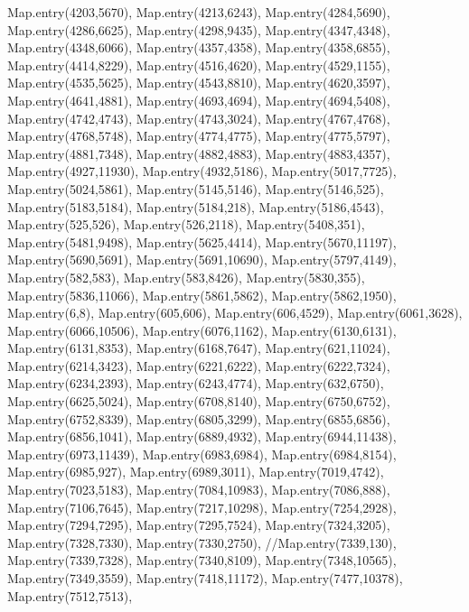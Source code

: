     Map.entry(4203,5670),
    Map.entry(4213,6243),
    Map.entry(4284,5690),
    Map.entry(4286,6625),
    Map.entry(4298,9435),
    Map.entry(4347,4348),
    Map.entry(4348,6066),
    Map.entry(4357,4358),
    Map.entry(4358,6855),
    Map.entry(4414,8229),
    Map.entry(4516,4620),
    Map.entry(4529,1155),
    Map.entry(4535,5625),
    Map.entry(4543,8810),
    Map.entry(4620,3597),
    Map.entry(4641,4881),
    Map.entry(4693,4694),
    Map.entry(4694,5408),
    Map.entry(4742,4743),
    Map.entry(4743,3024),
    Map.entry(4767,4768),
    Map.entry(4768,5748),
    Map.entry(4774,4775),
    Map.entry(4775,5797),
    Map.entry(4881,7348),
    Map.entry(4882,4883),
    Map.entry(4883,4357),
    Map.entry(4927,11930),
    Map.entry(4932,5186),
    Map.entry(5017,7725),
    Map.entry(5024,5861),
    Map.entry(5145,5146),
    Map.entry(5146,525),
    Map.entry(5183,5184),
    Map.entry(5184,218),
    Map.entry(5186,4543),
    Map.entry(525,526),
    Map.entry(526,2118),
    Map.entry(5408,351),
    Map.entry(5481,9498),
    Map.entry(5625,4414),
    Map.entry(5670,11197),
    Map.entry(5690,5691),
    Map.entry(5691,10690),
    Map.entry(5797,4149),
    Map.entry(582,583),
    Map.entry(583,8426),
    Map.entry(5830,355),
    Map.entry(5836,11066),
    Map.entry(5861,5862),
    Map.entry(5862,1950),
    Map.entry(6,8),
    Map.entry(605,606),
    Map.entry(606,4529),
    Map.entry(6061,3628),
    Map.entry(6066,10506),
    Map.entry(6076,1162),
    Map.entry(6130,6131),
    Map.entry(6131,8353),
    Map.entry(6168,7647),
    Map.entry(621,11024),
    Map.entry(6214,3423),
    Map.entry(6221,6222),
    Map.entry(6222,7324),
    Map.entry(6234,2393),
    Map.entry(6243,4774),
    Map.entry(632,6750),
    Map.entry(6625,5024),
    Map.entry(6708,8140),
    Map.entry(6750,6752),
    Map.entry(6752,8339),
    Map.entry(6805,3299),
    Map.entry(6855,6856),
    Map.entry(6856,1041),
    Map.entry(6889,4932),
    Map.entry(6944,11438),
    Map.entry(6973,11439),
    Map.entry(6983,6984),
    Map.entry(6984,8154),
    Map.entry(6985,927),
    Map.entry(6989,3011),
    Map.entry(7019,4742),
    Map.entry(7023,5183),
    Map.entry(7084,10983),
    Map.entry(7086,888),
    Map.entry(7106,7645),
    Map.entry(7217,10298),
    Map.entry(7254,2928),
    Map.entry(7294,7295),
    Map.entry(7295,7524),
    Map.entry(7324,3205),
    Map.entry(7328,7330),
    Map.entry(7330,2750),
    //Map.entry(7339,130),
    Map.entry(7339,7328),
    Map.entry(7340,8109),
    Map.entry(7348,10565),
    Map.entry(7349,3559),
    Map.entry(7418,11172),
    Map.entry(7477,10378),
    Map.entry(7512,7513),
